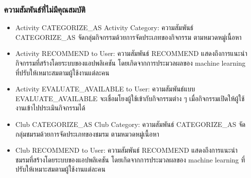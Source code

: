 \documentclass[14pt,oneside,openright,a4paper]{cpe-thai-project}
\begin{document}
      \subsubsection{ความสัมพันธ์ที่ไม่มีคุณสมบัติ}
        \normalsize
        \begin{itemize}
          \item Activity CATEGORIZE\_AS Activity Category: ความสัมพันธ์ CATEGORIZE\_AS จัดกลุ่มกิจกรรมด้วยการจัดประเภทของกิจกรรม ตามหมวดหมู่เนื้อหา
          \item Activity RECOMMEND to User: ความสัมพันธ์ RECOMMEND แสดงถึงการแนะนำกิจกรรมที่สร้างโดยระบบของแอปพลิเคชัน โดยเกิดจากการประมวลผลของ machine learning ที่ปรับให้เหมาะสมตามผู้ใช้งานแต่ละคน
          \item Activity EVALUATE\_AVAILABLE to User: ความสัมพันธ์แบบ EVALUATE\_AVAILABLE จะเชื่อมโยงผู้ใช้เข้ากับกิจกรรมต่าง ๆ เมื่อกิจกรรมเปิดให้ผู้ใช้งานเข้าไปประเมินกิจกรรมได้
          \item Club CATEGORIZE\_AS Club Category: ความสัมพันธ์ CATEGORIZE\_AS จัดกลุ่มชมรมด้วยการจัดประเภทของชมรม ตามหมวดหมู่เนื้อหา
          \item Club RECOMMEND to User: ความสัมพันธ์ RECOMMEND แสดงถึงการแนะนำชมรมที่สร้างโดยระบบของแอปพลิเคชัน โดยเกิดจากการประมวลผลของ machine learning ที่ปรับให้เหมาะสมตามผู้ใช้งานแต่ละคน
        \end{itemize}
\makeatletter
\g@addto@macro{\UrlBreaks}{\UrlOrds}
\makeatother



\end{document}
